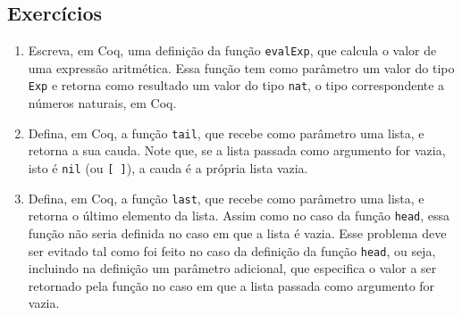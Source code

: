 \subsection{Exerc\'icios}

\begin{enumerate}
    \item Escreva, em Coq, uma definição da fun\c{c}\~ao \texttt{evalExp}, que calcula o valor de uma express\~ao aritm\'etica. Essa função tem como parâmetro um valor do tipo \texttt{Exp} e retorna como resultado um valor do tipo \texttt{nat}, o tipo correspondente a n\'umeros naturais, em Coq.
    \item Defina, em Coq, a função \texttt{tail}, que recebe como parâmetro uma lista, e retorna a sua cauda. Note que, se a lista passada como argumento for vazia, isto é \texttt{nil} (ou \texttt{[\,]}), a cauda é a própria lista vazia.
        \item Defina, em Coq, a função \texttt{last}, que recebe como parâmetro uma lista, e retorna o último elemento da lista. Assim como no caso da função \texttt{head}, essa função não seria definida no caso em que a lista é vazia. Esse problema deve ser evitado tal como foi feito no caso da definição da função \texttt{head}, ou seja, incluindo na definição um parâmetro adicional, que especifica o valor a ser retornado pela função no caso em que a lista passada como argumento for vazia.

\end{enumerate}
